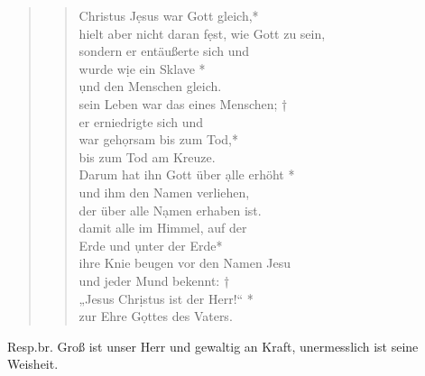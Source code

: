 


\begin{quote}
\begin{verse}


Christus J\d esus war Gott gleich,*\\
hielt aber nicht daran f\d est, wie Gott zu sein,\\
\vin sondern er entäußerte sich und \\ \vin wurde w\d ie ein Sklave *\\
\vin \d und den Menschen gleich. \\
sein Leben war das eines Menschen; †\\
er erniedrigte sich und \\war geh\d orsam bis zum Tod,* \\
bis zum Tod am Kreuze.\\
\vin Darum hat ihn Gott über \d alle erhöht *\\
\vin und ihm den Namen verliehen, \\
\vin der über alle N\d amen erhaben ist.\\
damit alle im Himmel, auf der \\Erde und \d unter der Erde*\\
ihre Knie beugen vor den Namen Jesu\\
\vin und jeder Mund bekennt: †\\
\vin „Jesus Chr\d istus ist der Herr!“ *\\
\vin zur Ehre G\d ottes des Vaters.\\	

\end{verse}

\end{quote}

\vspace{0.3cm}



\resp


\rm{Resp.br. Groß ist unser Herr und gewaltig an Kraft, unermesslich ist seine Weisheit.}

\bf
\vspace{0.6cm}


